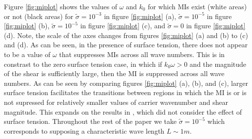 \documentclass{JFM_Style/jfm}
\begin{document}
Figure \ref{fig:miplot} shows the values of $\omega$ and $k_{0}$ for which MIs exist (white areas) or not (black areas) for $\tilde{\sigma}=10^{-3}$ in figure \ref{fig:miplot} (a), $\tilde{\sigma}=10^{-5}$ in figure \ref{fig:miplot} (b), $\tilde{\sigma}=10^{-5}$ in figure \ref{fig:miplot} (c), and $\tilde{\sigma}=0$ in  figure \ref{fig:miplot} (d).   Note, the scale of the axes changes from figures \ref{fig:miplot} (a) and (b) to (c) and (d).  As can be seen, in the presence of surface tension, there does not appear to be a value of $\omega$ that suppresses MIs across all wave numbers.  This is in constrast to the zero surface tension case, in which if $k_{0}\omega>0$ and the magnitude of the shear is sufficiently large, then the MI is suppressed across all wave numbers.  As can be seen by comparing figures \ref{fig:miplot} (a), (b), and (c), larger surface tension facilitates the transitions between regions in which the MI is or is not supressed for relatively smaller values of carrier wavenumber and shear magnitude.  This expands on the results in \cite{thomas2012nonlinear}, which did not consider the effect of surface tension.  Throughout the rest of the paper we take $\tilde{\sigma}=10^{-5}$ which corresponds to supposing a characteristic wave length $L\sim 1m$.
\end{document}
